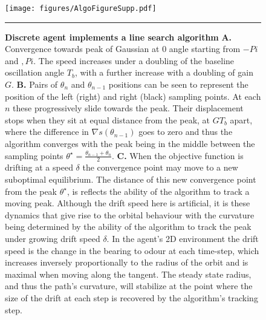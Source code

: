 \begin{figure}
\begin{center}
\texttt{[image: figures/AlgoFigureSupp.pdf]}
\caption{{\bf Discrete agent implements a line search algorithm} {\bf A.} Convergence towards peak of Gaussian at 0 angle starting from $-Pi$ and $,Pi$. The speed increases under a doubling of the baseline oscillation angle $T_b$, with a further increase with a doubling of gain $G$.    
{\bf B.} Pairs of $\theta_n$ and $\theta_{n-1}$ positions can be seen to represent the position of the left (right) and right (black) sampling points. At each $n$ these progressively slide towards the peak. Their displacement stops when they sit at equal distance from the peak, at $G T_b$ apart, where the difference in $\nabla s(\theta_{n-1})$ goes to zero and thus the algorithm converges with the peak being in the middle between the sampling points $\theta^{\star} =\frac{\theta_{n-1}+\theta_n}{2}$.
{\bf C.} When the objective function is drifting at a speed $\delta$ the convergence point may move to a new suboptimal equilibrium. The distance of this new convergence point from the peak $\theta^{\star}$, is reflects the ability of the algorithm to track a moving peak. Although the drift speed here is artificial, it is these dynamics that give rise to the orbital behaviour with the curvature being determined by the ability of the algorithm to track the peak under growing drift speed $\delta$. 
In the agent's 2D environment the drift speed is the change in the bearing to odour at each time-step, which increases inversely proportionally to the radius of the orbit and is maximal when moving along the tangent. %
 The steady state radius, and thus the path's curvature, will stabilize at the point where the size of the drift at each step is recovered by the algorithm's tracking step. 
\label{fig:AlgoAnalysis}}
\hrule
\end{center}
\end{figure}

